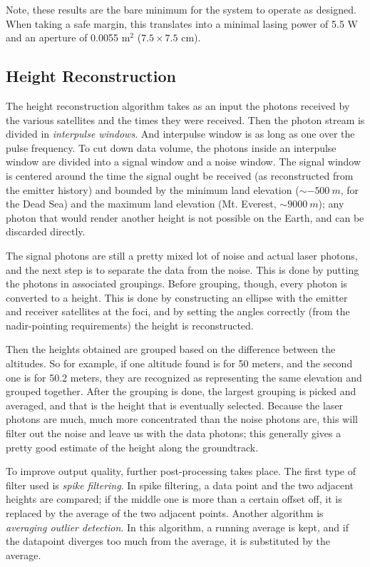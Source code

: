 Note, these results are the bare minimum for the system to operate as designed. When taking a safe margin, this translates into a minimal lasing power of 5.5 W and an aperture of 0.0055 m$^2$ ($7.5\times7.5$ cm). 

\subsection{Height Reconstruction}
\label{sec:HeightReconstruction}

The height reconstruction algorithm takes as an input the photons received by the various satellites and the times they were received. Then the photon stream is divided in \emph{interpulse windows}. And interpulse window is as long as one over the pulse frequency. To cut down data volume, the photons inside an interpulse window are divided into a signal window and a noise window. The signal window is centered around the time the signal ought be received (as reconstructed from the emitter history) and bounded by the minimum land elevation ($\sim -500\ m$, for the Dead Sea) and the maximum land elevation (Mt. Everest, $\sim 9000\ m$); any photon that would render another height is not possible on the Earth, and can be discarded directly.

The signal photons are still a pretty mixed lot of noise and actual laser photons, and the next step is to separate the data from the noise. This is done by putting the photons in associated groupings. Before grouping, though, every photon is converted to a height. This is done by constructing an ellipse with the emitter and receiver satellites at the foci, and by setting the angles correctly (from the nadir-pointing requirements) the height is reconstructed.

Then the heights obtained are grouped based on the difference between the altitudes. So for example, if one altitude found is for 50 meters, and the second one is for 50.2 meters, they are recognized as representing the same elevation and grouped together. After the grouping is done, the largest grouping is picked and averaged, and that is the height that is eventually selected. Because the laser photons are much, much more concentrated than the noise photons are, this will filter out the noise and leave us with the data photons; this generally gives a pretty good estimate of the height along the groundtrack.

To improve output quality, further post-processing takes place. The first type of filter used is \emph{spike filtering}. In spike filtering, a data point and the two adjacent heights are compared; if the middle one is more than a certain offset off, it is replaced by the average of the two adjacent points. Another algorithm is \emph{averaging outlier detection}. In this algorithm, a running average is kept, and if the datapoint diverges too much from the average, it is substituted by the average.

